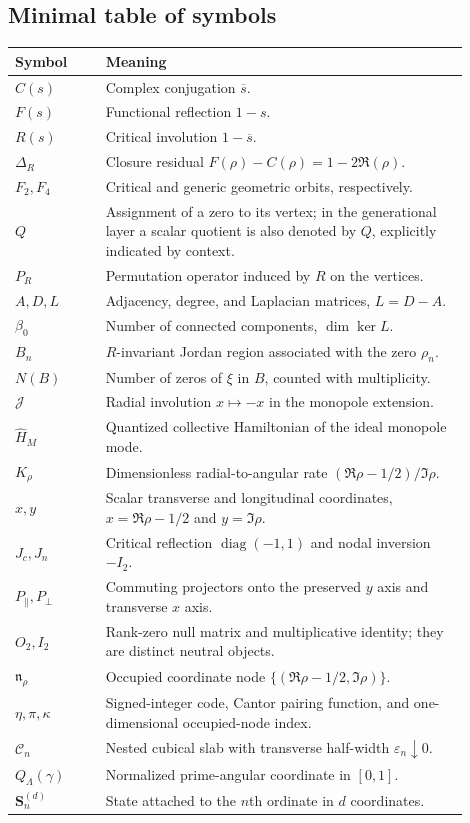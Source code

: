 \documentclass[11pt]{amsart}
\theoremstyle{definition}
\theoremstyle{remark}
\begin{document}
\subsection{Minimal table of symbols}
\begin{center}
\begin{tabular}{p{0.18\linewidth}p{0.72\linewidth}}
\toprule
\textbf{Symbol} & \textbf{Meaning}\\
\midrule
$C(s)$ & Complex conjugation $\overline{s}$.\\
$F(s)$ & Functional reflection $1-s$.\\
$R(s)$ & Critical involution $1-\overline{s}$.\\
$\Delta_R$ & Closure residual $F(\rho)-C(\rho)=1-2\Re(\rho)$.\\
$F_2,F_4$ & Critical and generic geometric orbits, respectively.\\
$Q$ & Assignment of a zero to its vertex; in the generational layer a scalar quotient is also denoted by $Q$, explicitly indicated by context.\\
$P_R$ & Permutation operator induced by $R$ on the vertices.\\
$A,D,L$ & Adjacency, degree, and Laplacian matrices, $L=D-A$.\\
$\beta_0$ & Number of connected components, $\dim\ker L$.\\
$B_n$ & $R$-invariant Jordan region associated with the zero $\rho_n$.\\
$N(B)$ & Number of zeros of $\xi$ in $B$, counted with multiplicity.\\
$\mathcal J$ & Radial involution $x\mapsto -x$ in the monopole extension.\\
$\widehat H_M$ & Quantized collective Hamiltonian of the ideal monopole mode.\\
$K_\rho$ & Dimensionless radial-to-angular rate $(\Re\rho-1/2)/\Im\rho$.\\
$x,y$ & Scalar transverse and longitudinal coordinates, $x=\Re\rho-1/2$ and $y=\Im\rho$.\\
$J_c,J_n$ & Critical reflection $\operatorname{diag}(-1,1)$ and nodal inversion $-I_2$.\\
$P_{\parallel},P_{\perp}$ & Commuting projectors onto the preserved $y$ axis and transverse $x$ axis.\\
$O_2,I_2$ & Rank-zero null matrix and multiplicative identity; they are distinct neutral objects.\\
$\mathfrak n_\rho$ & Occupied coordinate node $\{(\Re\rho-1/2,\Im\rho)\}$.\\
$\eta,\pi,\kappa$ & Signed-integer code, Cantor pairing function, and one-dimensional occupied-node index.\\
$\mathcal C_n$ & Nested cubical slab with transverse half-width $\varepsilon_n\downarrow0$.\\
$Q_\Lambda(\gamma)$ & Normalized prime-angular coordinate in $[0,1]$.\\
$\mathbf S_n^{(d)}$ & State attached to the $n$th ordinate in $d$ coordinates.\\
\bottomrule
\end{tabular}
\end{center}
\end{document}
